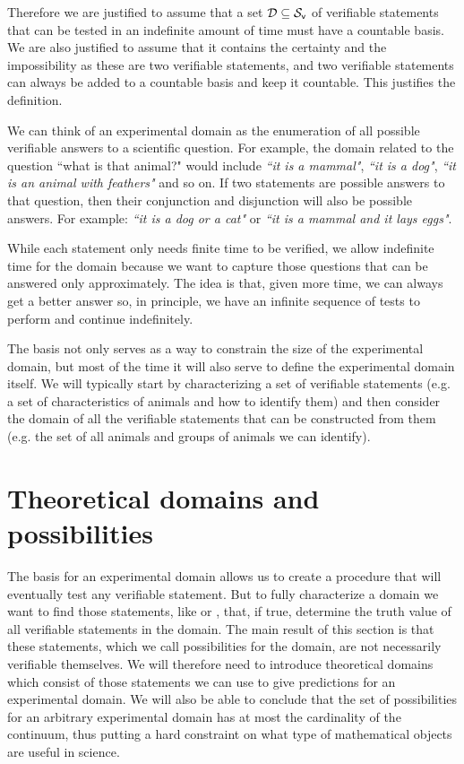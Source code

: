 \documentclass[11pt,letterpaper,fleqn]{memoir} %
\begin{document}
\begin{mathSection}
\begin{justification}
	Therefore we are justified to assume that a set $\mathcal{D} \subseteq \mathcal{S}_\textsf{v}$ of verifiable statements that can be tested in an indefinite amount of time must have a countable basis. We are also justified to assume that it contains the certainty and the impossibility as these are two verifiable statements, and two verifiable statements can always be added to a countable basis and keep it countable. This justifies the definition.
\end{justification}
\end{mathSection}

We can think of an experimental domain as the enumeration of all possible verifiable answers to a scientific question. For example, the domain related to the question ``what is that animal?" would include \emph{``it is a mammal"}, \emph{``it is a dog"}, \emph{``it is an animal with feathers"} and so on. If two statements are possible answers to that question, then their conjunction and disjunction will also be possible answers. For example: \emph{``it is a dog or a cat"} or \emph{``it is a mammal and it lays eggs"}.

While each statement only needs finite time to be verified, we allow indefinite time for the domain because we want to capture those questions that can be answered only approximately. The idea is that, given more time, we can always get a better answer so, in principle, we have an infinite sequence of tests to perform and continue indefinitely.

The basis not only serves as a way to constrain the size of the experimental domain, but most of the time it will also serve to define the experimental domain itself. We will typically start by characterizing a set of verifiable statements (e.g. a set of characteristics of animals and how to identify them) and then consider the domain of all the verifiable statements that can be constructed from them (e.g. the set of all animals and groups of animals we can identify).

\section{Theoretical domains and possibilities}

The basis for an experimental domain allows us to create a procedure that will eventually test any verifiable statement. But to fully characterize a domain we want to find those statements, like  or , that, if true, determine the truth value of all verifiable statements in the domain. The main result of this section is that these statements, which we call possibilities for the domain, are not necessarily verifiable themselves. We will therefore need to introduce theoretical domains which consist of those statements we can use to give predictions for an experimental domain. We will also be able to conclude that the set of possibilities for an arbitrary experimental domain has at most the cardinality of the continuum, thus putting a hard constraint on what type of mathematical objects are useful in science.
\end{document}

